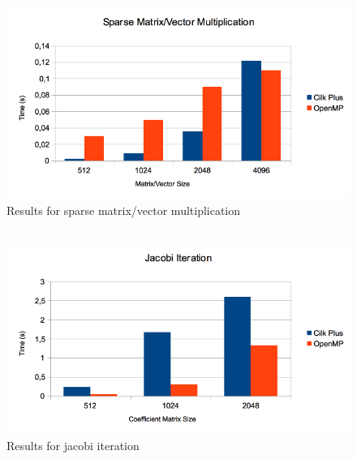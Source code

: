 \documentclass{beamer}
\begin{document}
\subsection{}
\begin{frame}
		\begin{figure}[!htb]
			\centering
			\includegraphics[scale=0.45]{images/sparse.png}
			\caption{Results for sparse matrix/vector multiplication}
			\label{roofline}
		\end{figure}
\end{frame}

\subsection{}
\begin{frame}
		\begin{figure}[!htb]
			\centering
			\includegraphics[scale=0.45]{images/jacobi.png}
			\caption{Results for jacobi iteration}
			\label{roofline}
		\end{figure}
\end{frame}
\end{document}
